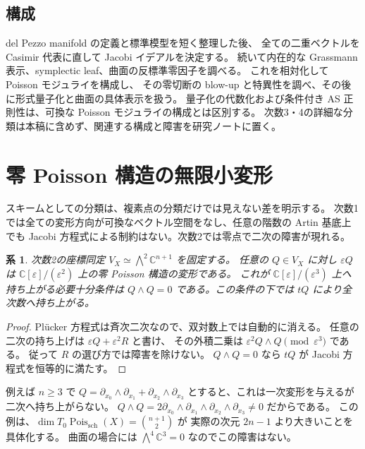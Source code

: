 \documentclass[a4paper,11pt]{ltjsarticle}
\numberwithin{equation}{section}
\theoremstyle{plain}
\newtheorem{corollary}[theorem]{系}
\theoremstyle{definition}
\newcommand{\C}{\mathbb C}
\newcommand{\Pois}{\operatorname{Pois}}
\begin{document}
\subsection{構成}
del Pezzo manifold の定義と標準模型を短く整理した後、
全ての二重ベクトルを Casimir 代表に直して Jacobi イデアルを決定する。
続いて内在的な Grassmann 表示、symplectic leaf、曲面の反標準零因子を調べる。
これを相対化して Poisson モジュライを構成し、
その零切断の blow-up と特異性を調べ、その後に形式量子化と曲面の具体表示を扱う。
量子化の代数化および条件付き AS 正則性は、可換な Poisson モジュライの構成とは区別する。
次数3・4の詳細な分類は本稿に含めず、関連する構成と障害を研究ノートに置く。








\section{零 Poisson 構造の無限小変形}
\label{sec:infinitesimal}
スキームとしての分類は、複素点の分類だけでは見えない差を明示する。
次数1では全ての変形方向が可換なベクトル空間をなし、任意の階数の Artin 基底上でも
Jacobi 方程式による制約はない。次数2では零点で二次の障害が現れる。

\begin{corollary}
\label{cor:second-order}
次数2の座標同定 $V_X\simeq\bigwedge^2\C^{n+1}$ を固定する。
任意の $Q\in V_X$ に対し $\varepsilon Q$ は
$\C[\varepsilon]/(\varepsilon^2)$ 上の零 Poisson 構造の変形である。
これが $\C[\varepsilon]/(\varepsilon^3)$ 上へ持ち上がる必要十分条件は
$Q\wedge Q=0$ である。この条件の下では $tQ$ により全次数へ持ち上がる。
\end{corollary}
\begin{proof}
Pl\"ucker 方程式は斉次二次なので、双対数上では自動的に消える。
任意の二次の持ち上げは $\varepsilon Q+\varepsilon^2R$ と書け、
その外積二乗は $\varepsilon^2Q\wedge Q\pmod{\varepsilon^3}$ である。
従って $R$ の選び方では障害を除けない。
$Q\wedge Q=0$ なら $tQ$ が Jacobi 方程式を恒等的に満たす。
\end{proof}

例えば $n\geq3$ で
$Q=\partial_{x_0}\wedge\partial_{x_1}+\partial_{x_2}\wedge\partial_{x_3}$
とすると、これは一次変形を与えるが二次へ持ち上がらない。
$Q\wedge Q=2\partial_{x_0}\wedge\partial_{x_1}\wedge
\partial_{x_2}\wedge\partial_{x_3}\neq0$ だからである。
この例は、$\dim T_0\Pois_{\mathrm{sch}}(X)=\binom{n+1}{2}$ が
実際の次元 $2n-1$ より大きいことを具体化する。
曲面の場合には $\bigwedge^4\C^3=0$ なのでこの障害はない。
\end{document}
